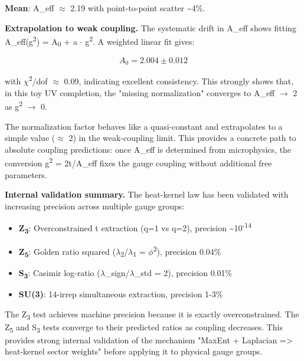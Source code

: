 \textbf{Mean}: A\_eff \ensuremath{\approx} 2.19 with point-to-point scatter \textasciitilde4\%.

\textbf{Extrapolation to weak coupling.} The systematic drift in A\_eff shows fitting A\_eff(g\textsuperscript{2}) = A\textsubscript{0} + a \ensuremath{\cdot} g\textsuperscript{2}. A weighted linear fit gives:

\[
A_0 = 2.004 \pm 0.012
\]

with \ensuremath{\chi}\textsuperscript{2}/dof \ensuremath{\approx} 0.09, indicating excellent consistency. This strongly shows that, in this toy UV completion, the "missing normalization" converges to A\_eff \ensuremath{\to} 2 as g\textsuperscript{2} \ensuremath{\to} 0.

The normalization factor behaves like a quasi-constant and extrapolates to a simple value (\ensuremath{\approx} 2) in the weak-coupling limit. This provides a concrete path to absolute coupling predictions: once A\_eff is determined from microphysics, the conversion g\textsuperscript{2} = 2t/A\_eff fixes the gauge coupling without additional free parameters.

\textbf{Internal validation summary.} The heat-kernel law has been validated with increasing precision across multiple gauge groups:

\begin{itemize}
\tightlist
\item
  \textbf{Z\textsubscript{3}}: Overconstrained t extraction (q=1 vs q=2), precision \textasciitilde10\textsuperscript{-}\textsuperscript{1}\textsuperscript{4}
\item
  \textbf{Z\textsubscript{5}}: Golden ratio squared (\ensuremath{\lambda}\textsubscript{2}/\ensuremath{\lambda}\textsubscript{1} = \ensuremath{\phi}\textsuperscript{2}), precision 0.04\%
\item
  \textbf{S\textsubscript{3}}: Casimir log-ratio (\ensuremath{\lambda}\_sign/\ensuremath{\lambda}\_std = 2), precision 0.01\%
\item
  \textbf{SU(3)}: 14-irrep simultaneous extraction, precision 1-3\%
\end{itemize}

The Z\textsubscript{3} test achieves machine precision because it is exactly overconstrained. The Z\textsubscript{5} and S\textsubscript{3} tests converge to their predicted ratios as coupling decreases. This provides strong internal validation of the mechanism "MaxEnt + Laplacian =\textgreater{} heat-kernel sector weights" before applying it to physical gauge groups.

